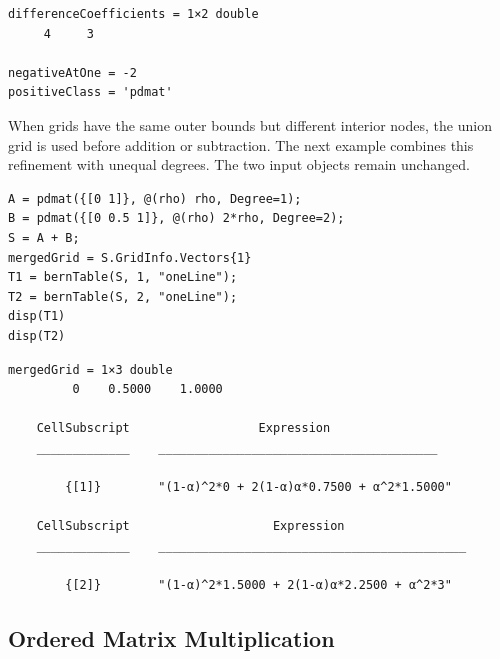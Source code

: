 \begin{lstlisting}[style=dpoutput]
differenceCoefficients = 1×2 double
     4     3

negativeAtOne = -2
positiveClass = 'pdmat'
\end{lstlisting}

\begin{center}
\end{center}

When grids have the same outer bounds but different interior nodes, the union grid is used before addition or subtraction. The next example combines this refinement with unequal degrees. The two input objects remain unchanged.

\begin{lstlisting}[style=dpmatlab]
A = pdmat({[0 1]}, @(rho) rho, Degree=1);
B = pdmat({[0 0.5 1]}, @(rho) 2*rho, Degree=2);
S = A + B;
mergedGrid = S.GridInfo.Vectors{1}
T1 = bernTable(S, 1, "oneLine");
T2 = bernTable(S, 2, "oneLine");
disp(T1)
disp(T2)
\end{lstlisting}

\begin{lstlisting}[style=dpoutput]
mergedGrid = 1×3 double
         0    0.5000    1.0000

    CellSubscript                  Expression
    _____________    _______________________________________

        {[1]}        "(1-α)^2*0 + 2(1-α)α*0.7500 + α^2*1.5000"

    CellSubscript                    Expression
    _____________    ___________________________________________

        {[2]}        "(1-α)^2*1.5000 + 2(1-α)α*2.2500 + α^2*3"
\end{lstlisting}

\subsection{Ordered Matrix Multiplication}
\label{sec:pdmat-operator-entries}

